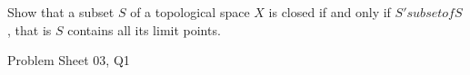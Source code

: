 \begin{samepage}
\begin{ex}
Show that a subset $S$ of a topological space $X$ is closed if and only if $S' subset of S$, that is $S$ contains all its limit points.
\end{ex}
\begin{source}
Problem Sheet 03, Q1
\end{source}
\end{samepage}
